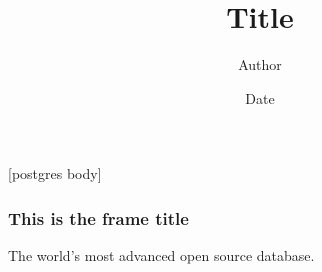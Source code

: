 \documentclass{beamer}
\title{Title}
\author[Author in Footer]{Author}
\institute[Institute in Footer]{Institute}
\date{Date}
\begin{document}
\frame{\titlepage}

[postgres body]

\frame
{
  \frametitle{This is the frame title}

  The world's most advanced open source database.
}
\end{document}
